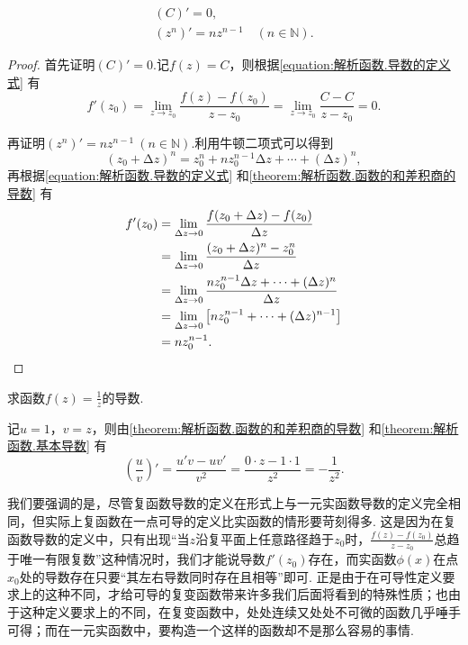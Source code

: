 \begin{theorem}\label{theorem:解析函数.基本导数}
\begin{gather}
(C)' = 0, \\
(z^n)' = n z^{n-1} \quad (n\in\mathbb{N}).
\end{gather}
\begin{proof}
首先证明\((C)' = 0\).记\(f(z) = C\)，则根据\cref{equation:解析函数.导数的定义式} 有\[
f'(z_0) = \lim\limits_{z \to z_0} \frac{f(z)-f(z_0)}{z-z_0}
= \lim\limits_{z \to z_0} \frac{C-C}{z-z_0} = 0.
\]

再证明\((z^n)' = n z^{n-1}\ (n\in\mathbb{N})\).利用牛顿二项式可以得到\[
(z_0 + \increment z)^n = z_0^n + n z_0^{n-1} \increment z + \dotsb + (\increment z)^n,
\]再根据\cref{equation:解析函数.导数的定义式} 和\cref{theorem:解析函数.函数的和差积商的导数} 有\begin{align*}
f'(z_0) &= \lim\limits_{\Delta z\to0} \frac{f(z_0+\Delta z)-f(z_0)}{\Delta z} \\
&= \lim\limits_{\Delta z\to0} \frac{(z_0+\Delta z)^n-z_0^n}{\Delta z} \\
&= \lim\limits_{\Delta z\to0} \frac{n z_0^{n-1} \Delta z + \dotsb + (\Delta z)^n}{\Delta z} \\
&= \lim\limits_{\Delta z\to0} \left[ n z_0^{n-1} + \dotsb + (\Delta z)^{n-1} \right] \\
&= n z_0^{n-1}.
\qedhere
\end{align*}
\end{proof}
\end{theorem}

\begin{example}
求函数\(f(z) = \frac{1}{z}\)的导数.
\begin{solution}
记\(u = 1\)，\(v = z\)，则由\cref{theorem:解析函数.函数的和差积商的导数} 和\cref{theorem:解析函数.基本导数} 有\[
\left(\frac{u}{v}\right)' = \frac{u' v - u v'}{v^2}
= \frac{0 \cdot z - 1 \cdot 1}{z^2}
= - \frac{1}{z^2}.
\]
\end{solution}
\end{example}

我们要强调的是，尽管复函数导数的定义在形式上与一元实函数导数的定义完全相同，但实际上复函数在一点可导的定义比实函数的情形要苛刻得多.
这是因为在复函数导数的定义中，只有出现“当\(z\)沿复平面上任意路径趋于\(z_0\)时，\(\frac{f(z) - f(z_0)}{z - z_0}\)总趋于唯一有限复数”这种情况时，我们才能说导数\(f'(z_0)\)存在，而实函数\(\phi(x)\)在点\(x_0\)处的导数存在只要“其左右导数同时存在且相等”即可.
正是由于在可导性定义要求上的这种不同，才给可导的复变函数带来许多我们后面将看到的特殊性质；也由于这种定义要求上的不同，在复变函数中，处处连续又处处不可微的函数几乎唾手可得；而在一元实函数中，要构造一个这样的函数却不是那么容易的事情.

